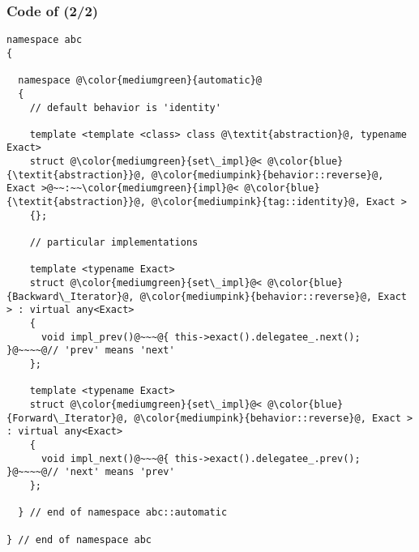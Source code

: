 \begin{frame}[fragile]
  \frametitle{Code of \bfreverseT (2/2)}

\begin{lstlisting}[escapechar=@,basicstyle={\tiny\sffamily}]
namespace abc
{

  namespace @\color{mediumgreen}{automatic}@
  {
    // default behavior is 'identity'

    template <template <class> class @\textit{abstraction}@, typename Exact>
    struct @\color{mediumgreen}{set\_impl}@< @\color{blue}{\textit{abstraction}}@, @\color{mediumpink}{behavior::reverse}@, Exact >@~~:~~\color{mediumgreen}{impl}@< @\color{blue}{\textit{abstraction}}@, @\color{mediumpink}{tag::identity}@, Exact >
    {};

    // particular implementations

    template <typename Exact>
    struct @\color{mediumgreen}{set\_impl}@< @\color{blue}{Backward\_Iterator}@, @\color{mediumpink}{behavior::reverse}@, Exact > : virtual any<Exact>
    {
      void impl_prev()@~~~@{ this->exact().delegatee_.next();  }@~~~~@// 'prev' means 'next' 
    };

    template <typename Exact>
    struct @\color{mediumgreen}{set\_impl}@< @\color{blue}{Forward\_Iterator}@, @\color{mediumpink}{behavior::reverse}@, Exact > : virtual any<Exact>
    {
      void impl_next()@~~~@{ this->exact().delegatee_.prev();  }@~~~~@// 'next' means 'prev'
    };

  } // end of namespace abc::automatic

} // end of namespace abc
\end{lstlisting}

\end{frame}






